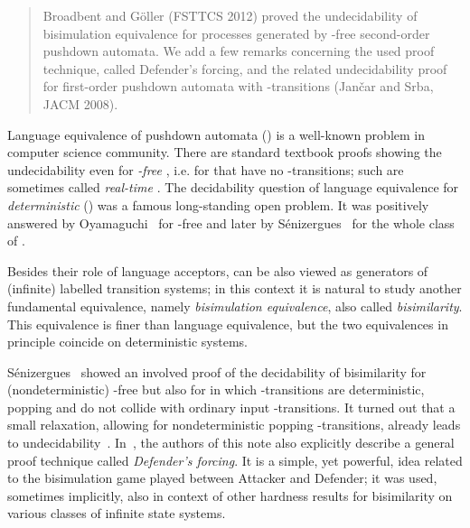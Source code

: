 \documentclass[11pt]{article}
\author{Petr Jan\v{c}ar \3mm] 
{\normalsize Department of Computer Science}\\
{\normalsize Aalborg University}\\ 
{\normalsize Denmark}\\
\texttt{srba@cs.aau.dk}}
\date{ }
\newcommand{\pda}{\text{PDA}\xspace}
\newcommand{\dpda}{\text{DPDA}\xspace}
\begin{document}
\maketitle

\vspace{-6mm}
\begin{abstract}
\noindent
Broadbent and G\"oller (FSTTCS 2012)
proved the undecidability of bisimulation equivalence for
processes generated by
-free second-order pushdown automata.
We add a few remarks concerning the
used proof technique, called Defender's forcing, 
and the related undecidability proof for  
first-order pushdown automata with -transitions 
(Jan\v{c}ar and Srba, JACM 2008).
\end{abstract}\vspace{3mm}

\noindent
Language equivalence of pushdown automata (\pda)
is a well-known problem in computer science community.
There are standard textbook proofs showing
the undecidability even for \emph{-free}
\pda, i.e. for \pda that have no -transitions;
such \pda are sometimes called \emph{real-time} \pda.
The decidability question of language equivalence 
for \emph{deterministic} \pda (\dpda)
was a famous
long-standing open problem. It was positively answered by 
Oyamaguchi~\cite{DBLP:journals/jacm/Oyamaguchi87}
for -free \dpda and later by 
S\'enizergues~\cite{Senizergues:TCS2001} for the whole class 
of \dpda.


Besides their role of language acceptors, 
\pda can be also viewed as generators of (infinite) labelled transition
systems; in this context it is natural to study another fundamental
equivalence, namely \emph{bisimulation equivalence}, also called
\emph{bisimilarity}. This equivalence
is finer than language equivalence, but the 
two equivalences in principle coincide on deterministic systems.

S\'enizergues~\cite{Senizergues:SIAM:05} 
showed an involved proof of the
decidability of bisimilarity for (nondeterministic)
-free \pda but also for \pda in which 
-transitions are deterministic, popping and 
do not collide with ordinary input -transitions.
It turned out that 
a small relaxation, allowing for nondeterministic
popping -transitions, already leads to 
undecidability~\cite{DBLP:journals/jacm/JancarS08}.
In~\cite{DBLP:journals/jacm/JancarS08}, the authors of this note also
explicitly describe
a general proof technique called \emph{Defender's forcing}. 
It is a simple, yet powerful, idea related to the bisimulation game
played between Attacker and Defender; it was used, sometimes
implicitly, also in context of other hardness results
for bisimilarity on various classes of infinite state systems.
\end{document}

